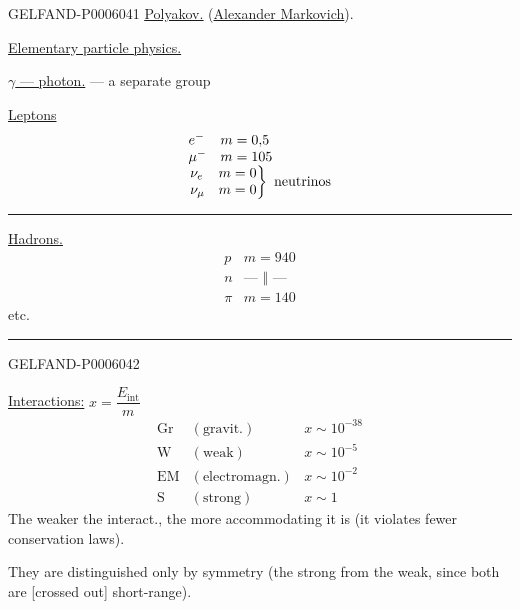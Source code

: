 \begin{GelfandAdjacentEvidence}{GELFAND-P000604}{1}
\underline{\underline{Polyakov.}} (\underline{Alexander Markovich}).

\underline{Elementary particle physics.}

\underline{\(\gamma\) — photon.} — a separate group

\underline{Leptons}
\[
\begin{array}{@{}l@{}}
\begin{array}{@{}ll@{}}
e^- & m=0{,}5\\
\mu^- & m=105
\end{array}\\[-.1ex]
\left.\begin{array}{@{}ll@{}}
\nu_e & m=0\\
\nu_\mu & m=0
\end{array}\right\}\text{ neutrinos}
\end{array}
\]
\par\noindent\rule{.31\linewidth}{.45pt}\par

\underline{Hadrons.}
\[
\begin{array}{ll}
p & m=940\\
n & \text{— \(\Vert\) —}\\
\pi & m=140
\end{array}
\]
etc.
\par\noindent\rule{.31\linewidth}{.45pt}\par
{}
\end{GelfandAdjacentEvidence}
\begin{GelfandAdjacentEvidence}{GELFAND-P000604}{2}


\underline{Interactions:}\qquad
{} \(x=\dfrac{E_{\text{int}}}{m}\)
\[
\begin{array}{lll}
\mathrm{Gr} & (\text{gravit.}) & x\sim10^{-38}\\
\mathrm W & (\text{weak}) & x\sim10^{-5}\\
\mathrm{EM} & (\text{electromagn.}) & x\sim10^{-2}\\
\mathrm S & (\text{strong}) & x\sim1
\end{array}
\]
The weaker the interact., the more accommodating it is (it violates fewer conservation laws).

They are distinguished only by symmetry (the strong from the weak, since both are [crossed out] short-range).
\end{GelfandAdjacentEvidence}
